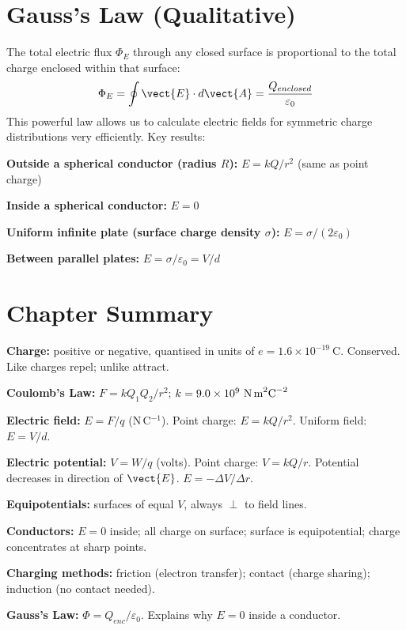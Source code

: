 \section{Gauss's Law (Qualitative)}

\begin{lawbox}
The total electric flux $\Phi_E$ through any closed
surface is proportional to the total charge enclosed
within that surface:
\[
  \Phi_E = \oint \vect{E} \cdot d\vect{A}
  = \frac{Q_{enclosed}}{\varepsilon_0}
\]
This powerful law allows us to calculate electric
fields for symmetric charge distributions very
efficiently. Key results:

\textbf{Outside a spherical conductor (radius $R$):}
$E = kQ/r^2$ (same as point charge)

\textbf{Inside a spherical conductor:} $E = 0$

\textbf{Uniform infinite plate (surface charge
density $\sigma$):} $E = \sigma/(2\varepsilon_0)$

\textbf{Between parallel plates:}
$E = \sigma/\varepsilon_0 = V/d$
\end{lawbox}

\section{Chapter Summary}

\begin{summarybox}
\textbf{Charge:} positive or negative, quantised
in units of $e = 1.6\times10^{-19}\ \text{C}$.
Conserved. Like charges repel; unlike attract.

\textbf{Coulomb's Law:}
$F = kQ_1Q_2/r^2$; $k = 9.0\times10^9\ \text{N\,m}^2\text{C}^{-2}$

\textbf{Electric field:} $E = F/q$ (N\,C$^{-1}$).
Point charge: $E = kQ/r^2$.
Uniform field: $E = V/d$.

\textbf{Electric potential:} $V = W/q$ (volts).
Point charge: $V = kQ/r$.
Potential decreases in direction of $\vect{E}$.
$E = -\Delta V/\Delta r$.

\textbf{Equipotentials:} surfaces of equal $V$,
always $\perp$ to field lines.

\textbf{Conductors:} $E = 0$ inside; all charge on
surface; surface is equipotential; charge
concentrates at sharp points.

\textbf{Charging methods:} friction (electron
transfer); contact (charge sharing); induction
(no contact needed).

\textbf{Gauss's Law:}
$\Phi = Q_{enc}/\varepsilon_0$.
Explains why $E = 0$ inside a conductor.
\end{summarybox}

